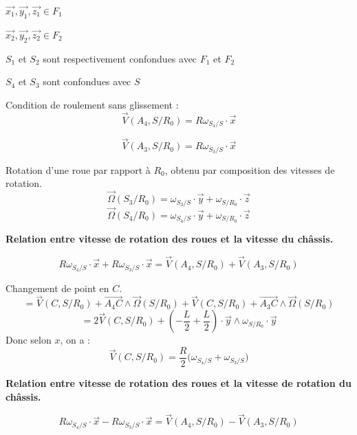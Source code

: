 \documentclass[a4paper,12pt]{report}  %
\begin{document}
$\vec{x_1},\vec{y_1},\vec{z_1} \in F_1$ 

$\vec{x_2},\vec{y_2},\vec{z_2} \in F_2$ 

$S_1$ et $S_2$ sont respectivement confondues avec $F_1$ et $F_2$ 

$S_4$ et $S_3$ sont confondues avec $S$ 




Condition de roulement sans glissement : 
\begin{equation}
\vec{V}(A_4, S/R_0) = R\omega_{S_4/S} \cdot \vec{x} \tag{1}
\end{equation}

\begin{equation}
\vec{V}(A_3, S/R_0)=R\omega_{S_3/S} \cdot \vec{x} \tag{2}
\end{equation}

Rotation d'une roue par rapport à $R_0$, obtenu par composition des vitesses de rotation. 
\begin{equation}
\vec{\Omega}(S_3/R_0) = \omega_{S_3/S} \cdot \vec{y} + \omega_{S/R_0} \cdot \vec{z} \tag{3}
\end{equation}
\begin{equation}	
\vec{\Omega}(S_4/R_0) = \omega_{S_4/S} \cdot \vec{y} + \omega_{S/R_0} \cdot \vec{z} \tag{4}
\end{equation}


\textbf{Relation entre vitesse de rotation des roues et la vitesse du châssis.} 

\begin{equation}
R\omega_{S_4/S} \cdot \vec{x} + R\omega_{S_3/S} \cdot \vec{x} =
\vec{V}(A_4, S/R_0) + \vec{V}(A_3, S/R_0) 
\tag{1)+(2}
\end{equation}

Changement de point en $C$. 
$$ = \vec{V}(C,S/R_0) 
+ \overrightarrow{A_{4}C} \wedge \vec{\Omega}(S/R_0) 
+ \vec{V}(C,S/R_0) 
+ \overrightarrow{A_{3}C} \wedge \vec{\Omega}(S/R_0) 
$$
$$
= 2\vec{V}(C,S/R_0) + (-\frac{L}{2} + \frac{L}{2}) \cdot \vec{y} \wedge \omega_{S/R_0} \cdot \vec{y}
$$
Donc selon $x$, on a : 
$$
\boxed{
	\vec{V}(C,S/R_0) = \frac{R}{2}\bigg( \omega_{S_4/S} + \omega_{S_3/S} \bigg)
}
$$


\textbf{Relation entre vitesse de rotation des roues et la vitesse de rotation du châssis.} 

\begin{equation}
R\omega_{S_4/S} \cdot \vec{x} - R\omega_{S_3/S} \cdot \vec{x} =
\vec{V}(A_4, S/R_0) - \vec{V}(A_3, S/R_0) 
\tag{1)–(2}
\end{equation}
\end{document}
